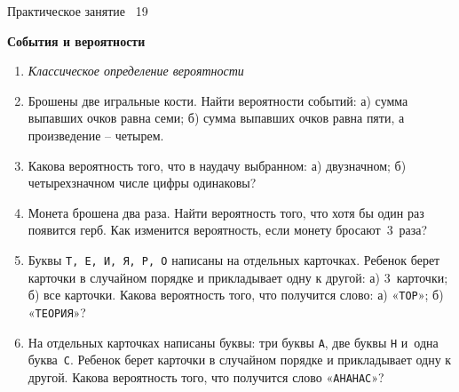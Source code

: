 \documentclass[a4paper,14pt]{extarticle}
\begin{document}
{\centering
 {\small Практическое занятие \textnumero~19 \par}
{\bfseries События и вероятности}
\par}
\begin{enumerate}

\item[]{\centering\itshape Классическое определение вероятности\par}
\item 
Брошены две игральные кости. Найти вероятности событий: а) сумма
выпавших очков равна семи; б) сумма выпавших очков равна пяти, а
произведение – четырем.

 \item 
 Какова вероятность того, что в наудачу выбранном: а) двузначном; б) четырехзначном числе цифры одинаковы?

\item 
Монета брошена два раза. Найти вероятность того, что хотя бы один раз
появится герб. Как изменится вероятность, если монету бросают~$3$~раза?









\item 
Буквы \texttt{Т, Е, И, Я, Р, О} написаны на отдельных карточках. Ребенок берет
карточки в случайном порядке и прикладывает одну к другой: а) 3~карточки; б) все карточки. Какова вероятность того, что получится
слово: а) «\texttt{ТОР}»; б) «\texttt{ТЕОРИЯ}»?

 \item 
 На отдельных карточках написаны буквы: три буквы \texttt{А}, две буквы \texttt{Н} и~одна буква~\texttt{С}. Ребенок берет карточки в случайном порядке и прикладывает
 одну к другой. Какова вероятность того, что получится слово «\texttt{АНАНАС}»?



\end{enumerate}
\end{document}
